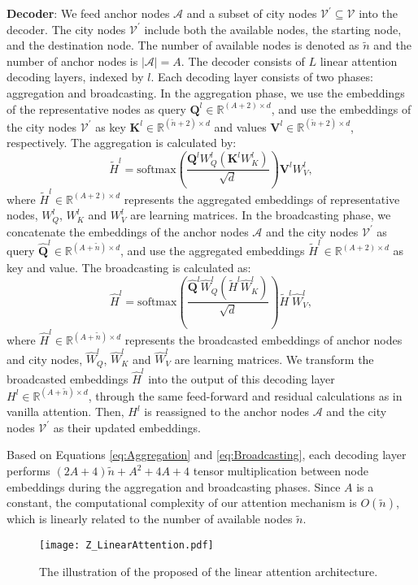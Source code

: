 \textbf{Decoder}: 
We feed anchor nodes $\mathcal{A}$ and a subset of city nodes $\mathcal{V}^{\prime} \subseteq \mathcal{V}$ into the decoder. The city nodes $\mathcal{V}^{\prime}$ include both the available nodes, the starting node, and the destination node. The number of available nodes is denoted as $\tilde{n}$ and the number of anchor nodes is $|\mathcal{A}|=A$. 
The decoder consists of $L$ linear attention decoding layers, indexed by $l$. 
Each decoding layer consists of two phases: aggregation and broadcasting. 
In the aggregation phase, we use the embeddings of the representative nodes as query $\mathbf{Q}_{}^{l} \in \mathbb{R}^{(A+2) \times d}$, and use the embeddings of the city nodes $\mathcal{V}^{\prime}$ as key $\mathbf{K}^{l} \in \mathbb{R}^{(\tilde{n}+2) \times d}$ and values $\mathbf{V}^{l} \in \mathbb{R}^{(\tilde{n}+2) \times d}$, respectively. The aggregation is calculated by: 
\begin{equation}
{\tilde{H}^{l}=\text{softmax}\left(\frac{\mathbf{Q}_{}^{l} W_{Q}^{l}(\mathbf{K}_{}^{l} W_{K}^{l})}{\sqrt{d}}\right)\mathbf{V}^{l}W_{V}^{l}},
\label{eq:Aggregation}
\end{equation}
where $\tilde{H}^{l} \in \mathbb{R}^{(A+2) \times d}$ represents the aggregated embeddings of representative nodes, $W_{Q}^{l}$, $W_{K}^{l}$ and $W_{V}^{l}$ are learning matrices. In the broadcasting phase, we concatenate the embeddings of the anchor nodes $\mathcal{A}$ and the city nodes $\mathcal{V}^{\prime}$ as query $\hat{\mathbf{Q}}_{}^{l} \in \mathbb{R}^{(A+\tilde{n}) \times d}$, and use the aggregated embeddings $\tilde{H}^{l} \in \mathbb{R}^{(A+2) \times d}$ as key and value. The broadcasting is calculated as: 
\begin{equation}
{\hat{H}^{l}=\text{softmax}\left(\frac{\hat{\mathbf{Q}}_{}^{l} \hat{W}_{Q}^{l}(\tilde{H}^{l} \hat{W}_{K}^{l})}{\sqrt{d}}\right)\tilde{H}^{l}\hat{W}_{V}^{l}},
\label{eq:Broadcasting}
\end{equation}
where $\hat{H}^{l} \in \mathbb{R}^{(A+\tilde{n}) \times d}$ represents the broadcasted embeddings of anchor nodes and city nodes, $\hat{W}_{Q}^{l}$, $\hat{W}_{K}^{l}$ and $\hat{W}_{V}^{l}$ are learning matrices. 
We transform the broadcasted embeddings $\hat{H}^{l}$ into the output of this decoding layer $H^{l} \in \mathbb{R}^{(A+\tilde{n}) \times d}$, through the same feed-forward and residual calculations as in vanilla attention. Then, $H^{l}$ is reassigned to the anchor nodes $\mathcal{A}$ and the city nodes $\mathcal{V}^{\prime}$ as their updated embeddings. 

Based on Equations \eqref{eq:Aggregation} and \eqref{eq:Broadcasting}, 
each decoding layer performs $(2A+4)\tilde{n}+A^2+4A+4$ tensor multiplication between node embeddings during the aggregation and broadcasting phases.
Since $A$ is a constant, the computational complexity of our attention mechanism is ${O}(\tilde{n})$, which is linearly related to the number of available nodes $\tilde{n}$.
\begin{figure}[t]
\centering
\texttt{[image: Z\_LinearAttention.pdf]}
\caption{The illustration of the proposed of the linear attention architecture.}
\label{fig:LinearAttention}
\end{figure}
